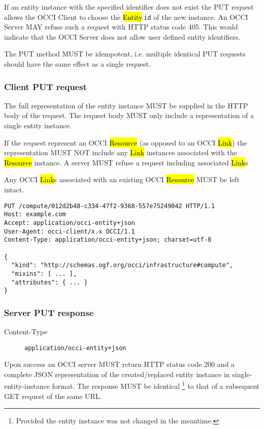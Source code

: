 \documentclass[10pt,a4paper]{article}
\begin{document}
If an entity instance with the specified identifier does not exist the PUT
request allows the OCCI Client to choose the \hl{Entity}.{\tt id} of the new
instance.
An OCCI Server MAY refuse such a request with HTTP status code 405. This would
indicate that the OCCI Server does not allow user defined entity identifiers.

The PUT method MUST be idempotent, i.e. multiple identical PUT requests should
have the same effect as a single request.


\subsubsection{Client PUT request}
The full representation of the entity instance MUST be supplied in the HTTP
body of the request. The request body MUST only include a representation of
a single entity instance.

If the request represent an OCCI \hl{Resource} (as opposed to an OCCI
\hl{Link}) the representation MUST NOT include any \hl{Link} instances
associated with the \hl{Resource} instance.
A server MUST refuse a request including associated \hl{Link}s

Any OCCI \hl{Link}s associated with an existing OCCI \hl{Resource} MUST be left
intact.
\begin{verbatim}
PUT /compute/012d2b48-c334-47f2-9368-557e75249042 HTTP/1.1
Host: example.com
Accept: application/occi-entity+json
User-Agent: occi-client/x.x OCCI/1.1
Content-Type: application/occi-entity+json; charset=utf-8

{
  "kind": "http://schemas.ogf.org/occi/infrastructure#compute",
  "mixins": [ ... ],
  "attributes": { ... }
}
\end{verbatim}

\subsubsection{Server PUT response}
\begin{description}
\item[Content-Type] {\tt application/occi-entity+json}
\end{description}
Upon success an OCCI server MUST return HTTP status code 200 and a complete
JSON representation of the created/replaced entity instance in
single-entity-instance format.
The response MUST be identical%
\footnote{Provided the entity instance was not changed in the meantime.}
to that of a subsequent GET request of the same URL.
\end{document}
